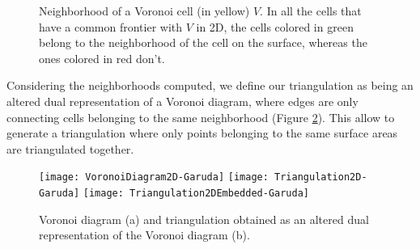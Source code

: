 \documentclass[11pt,fleqn]{book} %
\begin{document}
\begin{figure}[ht]
\centering
{}
\caption{Neighborhood of a Voronoi cell (in yellow) $V$. In all the cells that have a common frontier with $V$ in 2D, the cells colored in green belong to the neighborhood of the cell on the surface, whereas the ones colored in red don't.}
\label{fig:voronoi_cell_neighborhood}
\end{figure}

Considering the neighborhoods computed, we define our triangulation as being an altered dual representation of a Voronoi diagram, where edges are only connecting cells belonging to the same neighborhood (Figure \ref{fig:voronoi_diagram_triangulation}).
This allow to generate a triangulation where only points belonging to the same surface areas are triangulated together.

\begin{figure}[ht]
\centering\texttt{[image: VoronoiDiagram2D-Garuda]}
\centering\texttt{[image: Triangulation2D-Garuda]}
\centering\texttt{[image: Triangulation2DEmbedded-Garuda]}
\caption{Voronoi diagram (a) and triangulation obtained as an altered dual representation of the Voronoi diagram (b).}
\label{fig:voronoi_diagram_triangulation}
\end{figure}
\end{document}
